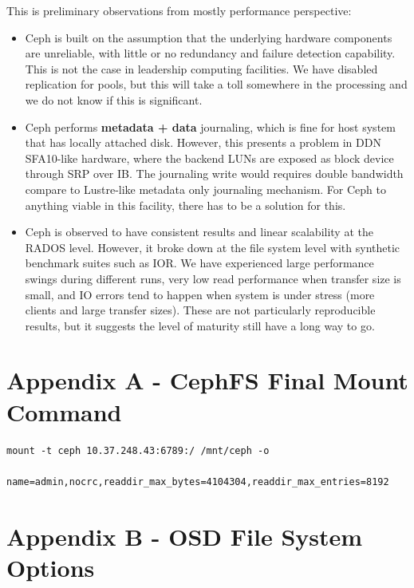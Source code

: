 \documentclass{article}
\begin{document}
This is preliminary observations from mostly performance perspective:

\begin{itemize}

  \item Ceph is built on the assumption that the underlying hardware components
  are unreliable, with little or no redundancy and failure detection capability.
  This is not the case in leadership computing facilities. We have disabled
  replication for pools, but this will take a toll somewhere in the processing
  and we do not know if this is significant.

  \item Ceph performs \textbf{metadata + data} journaling, which is fine for host
  system that has locally attached disk. However, this presents a problem in DDN
  SFA10-like hardware, where the backend LUNs are exposed as block device
  through SRP over IB. The journaling write would requires double bandwidth
  compare to Lustre-like metadata only journaling mechanism. For Ceph to anything
  viable in this facility, there has to be a solution for this.

  \item Ceph is observed to have consistent results and linear scalability at the
  RADOS level. However, it broke down at the file system level with synthetic
  benchmark suites such as IOR. We have experienced large performance swings
  during different runs, very low read performance when transfer size is small,
  and IO errors tend to happen when system is under stress (more clients and
  large transfer sizes). These are not particularly reproducible results, but it
  suggests the level of maturity still have a long way to go.
  
\end{itemize}

\section*{Appendix A - CephFS Final Mount Command}

\begin{Verbatim}
mount -t ceph 10.37.248.43:6789:/ /mnt/ceph -o
      name=admin,nocrc,readdir_max_bytes=4104304,readdir_max_entries=8192
\end{Verbatim}


\section*{Appendix B - OSD File System Options}
\end{document}
